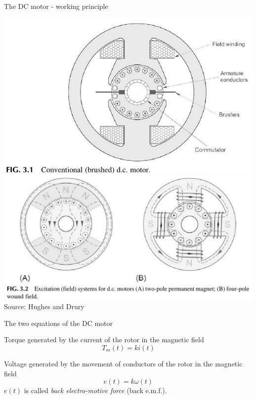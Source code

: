 \documentclass[presentation,aspectratio=169]{beamer}
\begin{document}
\begin{frame}[label={sec:orgcc446c7}]{The DC motor - working principle}
\begin{center}
\includegraphics[width=0.4\linewidth]{../../figures/HD-fig3_1.png}
\includegraphics[width=0.53\linewidth]{../../figures/HD-fig3_2.png}
{\footnotesize Source: Hughes and Drury}
\end{center}
\end{frame}



\begin{frame}[label={sec:org29bf14f}]{The two equations of the DC motor}
\begin{block}{Torque generated by the current of the rotor in the magnetic field}
\[ T_m(t) = k i(t) \]
\end{block}

\begin{block}{Voltage generated by the movement of conductors of the rotor in the magnetic field}
\[ e(t) = k \omega(t)\]
\(e(t)\) is called \emph{back electro-motive force} (back e.m.f.).
\end{block}
\end{frame}
\end{document}
